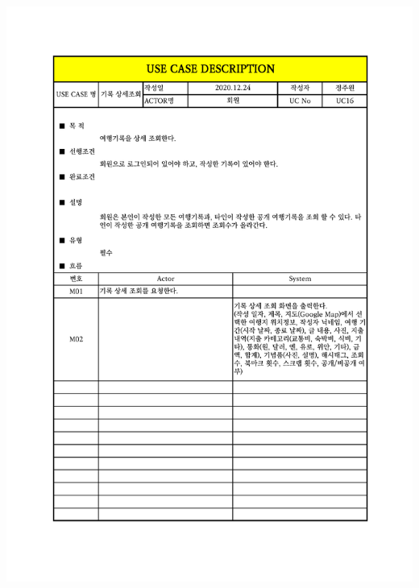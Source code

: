 {{{{{{{{{{{{{{{{{{\includegraphics[width=1.1\textwidth]{./Figure/Design/Display/usecase/016.pdf} \\
}}}}}}}}}}}}}}}}}}
